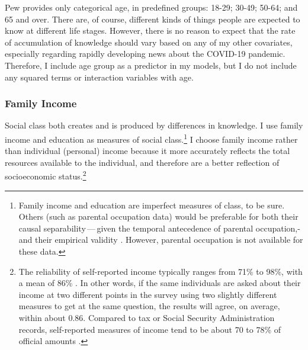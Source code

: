 \documentclass[11pt]{article}
\begin{document}
Pew provides only categorical age, in predefined groups: 18-29; 30-49; 50-64; and 65 and over. There are, of course, different kinds of things people are expected to know at different life stages. However, there is no reason to expect that the rate of accumulation of knowledge should vary based on any of my other covariates, especially regarding rapidly developing news about the COVID-19 pandemic. Therefore, I include age group as a predictor in my models, but I do not include any squared terms or interaction variables with age.




\subsubsection{Family Income}\label{sec:class-income}

Social class both creates and is produced by differences in knowledge. I use family income and education as measures of social class.\footnote
    {Family income and education are imperfect measures of class, to be sure. Others (such as parental occupation data) would be preferable for both their causal separability\,---\,given the temporal antecedence of parental occupation,\--\,and their empirical validity \citep{Weeden2005a, Weeden2012}. However, parental occupation is not available for these data.}
I choose family income rather than individual (personal) income because it more accurately reflects the total resources available to the individual, and therefore are a better reflection of socioeconomic status.\footnote
  {The reliability of self-reported income typically ranges from 71\% to 98\%, with a mean of 86\% \citep{Marquis1986}. In other words, if the same individuals are asked about their income at two different points in the survey using two slightly different measures to get at the same question, the results will agree, on average, within about 0.86. Compared to tax or Social Security Administration records, self-reported measures of income tend to be about 70  to 78\% of official amounts \citep{Coder1996, Reardon2011a}.}
\end{document}

